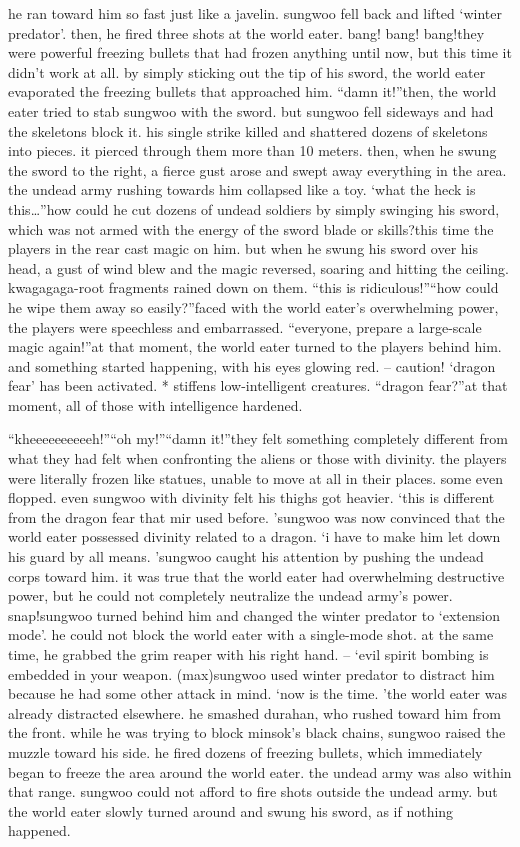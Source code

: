  he ran toward him so fast just like a javelin.
sungwoo fell back and lifted ‘winter predator’.
 then, he fired three shots at the world eater.
bang! bang! bang!they were powerful freezing bullets that had frozen anything until now, but this time it didn’t work at all.
 by simply sticking out the tip of his sword, the world eater evaporated the freezing bullets that approached him.
“damn it!”then, the world eater tried to stab sungwoo with the sword.
 but sungwoo fell sideways and had the skeletons block it.
his single strike killed and shattered dozens of skeletons into pieces.
 it pierced through them more than 10 meters.
 then, when he swung the sword to the right, a fierce gust arose and swept away everything in the area.
 the undead army rushing towards him collapsed like a toy.
‘what the heck is this…”how could he cut dozens of undead soldiers by simply swinging his sword, which was not armed with the energy of the sword blade or skills?this time the players in the rear cast magic on him.
 but when he swung his sword over his head, a gust of wind blew and the magic reversed, soaring and hitting the ceiling.
kwagagaga-root fragments rained down on them.
“this is ridiculous!”“how could he wipe them away so easily?”faced with the world eater’s overwhelming power, the players were speechless and embarrassed.
“everyone, prepare a large-scale magic again!”at that moment, the world eater turned to the players behind him.
 and something started happening, with his eyes glowing red.
– caution! ‘dragon fear’ has been activated.
* stiffens low-intelligent creatures.
“dragon fear?”at that moment, all of those with intelligence hardened.


“kheeeeeeeeeeh!”“oh my!”“damn it!”they felt something completely different from what they had felt when confronting the aliens or those with divinity.
 the players were literally frozen like statues, unable to move at all in their places.
 some even flopped.
 even sungwoo with divinity felt his thighs got heavier.
‘this is different from the dragon fear that mir used before.
’sungwoo was now convinced that the world eater possessed divinity related to a dragon.
‘i have to make him let down his guard by all means.
’sungwoo caught his attention by pushing the undead corps toward him.
 it was true that the world eater had overwhelming destructive power, but he could not completely neutralize the undead army’s power.
snap!sungwoo turned behind him and changed the winter predator to ‘extension mode’.
 he could not block the world eater with a single-mode shot.
 at the same time, he grabbed the grim reaper with his right hand.
– ‘evil spirit bombing is embedded in your weapon.
 (max)sungwoo used winter predator to distract him because he had some other attack in mind.
‘now is the time.
’the world eater was already distracted elsewhere.
 he smashed durahan, who rushed toward him from the front.
 while he was trying to block minsok’s black chains, sungwoo raised the muzzle toward his side.
he fired dozens of freezing bullets, which immediately began to freeze the area around the world eater.
 the undead army was also within that range.
 sungwoo could not afford to fire shots outside the undead army.
but the world eater slowly turned around and swung his sword, as if nothing happened.


 